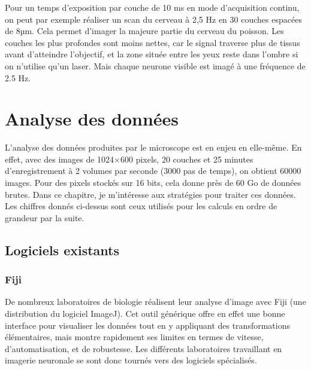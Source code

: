 Pour un temps d'exposition par couche de 10 ms en mode d'acquisition continu, on peut par exemple réaliser un scan du cerveau à 2,5 Hz en 30 couches espacées de 8µm. Cela permet d'imager la majeure partie du cerveau du poisson. Les couches les plus profondes sont moins nettes, car le signal traverse plus de tissus avant d'atteindre l'objectif, et la zone située entre les yeux reste dans l'ombre si on n'utilise qu'un laser. Mais chaque neurone visible est imagé à une fréquence de 2.5 Hz.








\section{Analyse des données}

L'analyse des données produites par le microscope est en enjeu en elle-même. En effet, avec des images de 1024$\times$600 pixels, 20 couches et 25 minutes d'enregistrement à 2 volumes par seconde (3000 pas de temps), on obtient 60000 images. Pour des pixels stockés sur 16 bits, cela donne près de 60 Go de données brutes. Dans ce chapitre, je m'intéresse aux stratégies pour traiter ces données. Les chiffres donnés ci-dessus sont ceux utilisés pour les calculs en ordre de grandeur par la suite.

\subsection{Logiciels existants}

\subsubsection{Fiji}

De nombreux laboratoires de biologie réalisent leur analyse d'image avec Fiji (une distribution du logiciel ImageJ). Cet outil générique offre en effet une bonne interface pour visualiser les données tout en y appliquant des transformations élémentaires, mais montre rapidement ses limites en termes de vitesse, d'automatisation, et de robustesse. Les différents laboratoires travaillant en imagerie neuronale se sont donc tournés vers des logiciels spécialisés.

